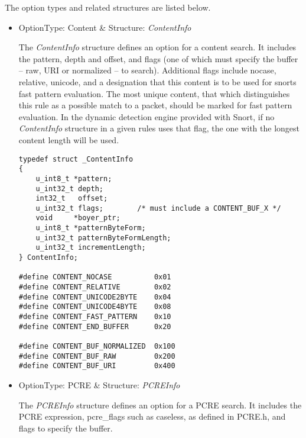 \documentclass[english]{report}
\begin{document}
The option types and related structures are listed below.
\begin{itemize}
%
%

\item {OptionType: Content \& Structure: {\em ContentInfo}}

The {\em ContentInfo} structure defines an option for a content
search.  It includes the pattern, depth and offset, and flags (one of
which must specify the buffer -- raw, URI or normalized -- to search).
Additional flags include nocase, relative, unicode, and a designation
that this content is to be used for snorts fast pattern evaluation.
The most unique content, that which distinguishes this rule as a
possible match to a packet, should be marked for fast pattern evaluation.
In the dynamic detection engine provided with Snort, if no {\em
ContentInfo} structure in a given rules uses that flag, the one with the
longest content length will be used.

\begin{verbatim}
typedef struct _ContentInfo
{
    u_int8_t *pattern;
    u_int32_t depth;
    int32_t   offset;
    u_int32_t flags;        /* must include a CONTENT_BUF_X */
    void     *boyer_ptr;
    u_int8_t *patternByteForm;
    u_int32_t patternByteFormLength;
    u_int32_t incrementLength;
} ContentInfo;

#define CONTENT_NOCASE          0x01
#define CONTENT_RELATIVE        0x02
#define CONTENT_UNICODE2BYTE    0x04
#define CONTENT_UNICODE4BYTE    0x08
#define CONTENT_FAST_PATTERN    0x10
#define CONTENT_END_BUFFER      0x20

#define CONTENT_BUF_NORMALIZED  0x100
#define CONTENT_BUF_RAW         0x200
#define CONTENT_BUF_URI         0x400
\end{verbatim}

\item {OptionType: PCRE \& Structure: {\em PCREInfo}}

The {\em PCREInfo} structure defines an option for a PCRE search.
It includes the PCRE expression, pcre\_flags such as caseless, as
defined in PCRE.h, and flags to specify the buffer.


\end{itemize}
\end{document}
